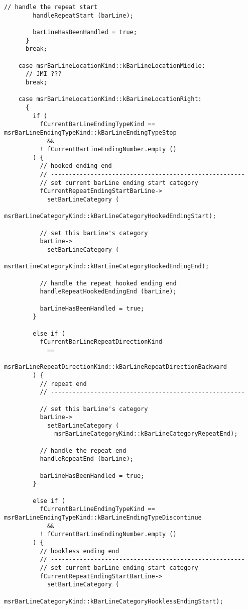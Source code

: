 \begin{lstlisting}[language=CPlusPlus]
        // handle the repeat start
        handleRepeatStart (barLine);

        barLineHasBeenHandled = true;
      }
      break;

    case msrBarLineLocationKind::kBarLineLocationMiddle:
      // JMI ???
      break;

    case msrBarLineLocationKind::kBarLineLocationRight:
      {
        if (
          fCurrentBarLineEndingTypeKind == msrBarLineEndingTypeKind::kBarLineEndingTypeStop
            &&
          ! fCurrentBarLineEndingNumber.empty ()
        ) {
          // hooked ending end
          // ------------------------------------------------------
          // set current barLine ending start category
          fCurrentRepeatEndingStartBarLine->
            setBarLineCategory (
              msrBarLineCategoryKind::kBarLineCategoryHookedEndingStart);

          // set this barLine's category
          barLine->
            setBarLineCategory (
              msrBarLineCategoryKind::kBarLineCategoryHookedEndingEnd);

          // handle the repeat hooked ending end
          handleRepeatHookedEndingEnd (barLine);

          barLineHasBeenHandled = true;
        }

        else if (
          fCurrentBarLineRepeatDirectionKind
            ==
          msrBarLineRepeatDirectionKind::kBarLineRepeatDirectionBackward
        ) {
          // repeat end
          // ------------------------------------------------------

          // set this barLine's category
          barLine->
            setBarLineCategory (
              msrBarLineCategoryKind::kBarLineCategoryRepeatEnd);

          // handle the repeat end
          handleRepeatEnd (barLine);

          barLineHasBeenHandled = true;
        }

        else if (
          fCurrentBarLineEndingTypeKind == msrBarLineEndingTypeKind::kBarLineEndingTypeDiscontinue
            &&
          ! fCurrentBarLineEndingNumber.empty ()
        ) {
          // hookless ending end
          // ------------------------------------------------------
          // set current barLine ending start category
          fCurrentRepeatEndingStartBarLine->
            setBarLineCategory (
              msrBarLineCategoryKind::kBarLineCategoryHooklessEndingStart);


\end{lstlisting}
